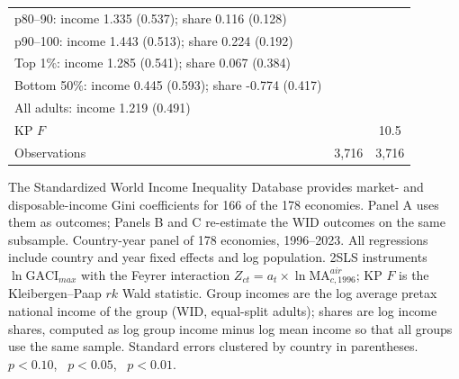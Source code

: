 \begin{table}[p]
\begin{threeparttable}
\begin{tabular}{lcc}
p80--90: income 1.335\sym{**} (0.537); share 0.116 (0.128) & & \\
p90--100: income 1.443\sym{***} (0.513); share 0.224 (0.192) & & \\
Top 1\%: income 1.285\sym{**} (0.541); share 0.067 (0.384) & & \\
Bottom 50\%: income 0.445 (0.593); share -0.774\sym{*} (0.417) & & \\
All adults: income 1.219\sym{**} (0.491) & & \\
\midrule
KP $F$ & & 10.5 \\
Observations & 3{,}716 & 3{,}716 \\
\bottomrule
\end{tabular}
\begin{tablenotes}\small
\item The Standardized World Income Inequality Database \citep{Solt_2020} provides market- and disposable-income Gini coefficients for 166 of the 178 economies. Panel A uses them as outcomes; Panels B and C re-estimate the WID outcomes on the same subsample. Country-year panel of 178 economies, 1996--2023. All regressions include country and year fixed effects and log population. 2SLS instruments $\ln\mathrm{GACI}_{max}$ with the Feyrer interaction $Z_{ct}=a_t\times\ln\mathrm{MA}^{air}_{c,1996}$; KP $F$ is the Kleibergen--Paap $rk$ Wald statistic. Group incomes are the log average pretax national income of the group (WID, equal-split adults); shares are log income shares, computed as log group income minus log mean income so that all groups use the same sample. Standard errors clustered by country in parentheses. \sym{*}~$p<0.10$, \sym{**}~$p<0.05$, \sym{***}~$p<0.01$.
\end{tablenotes}
\end{threeparttable}
\end{table}

